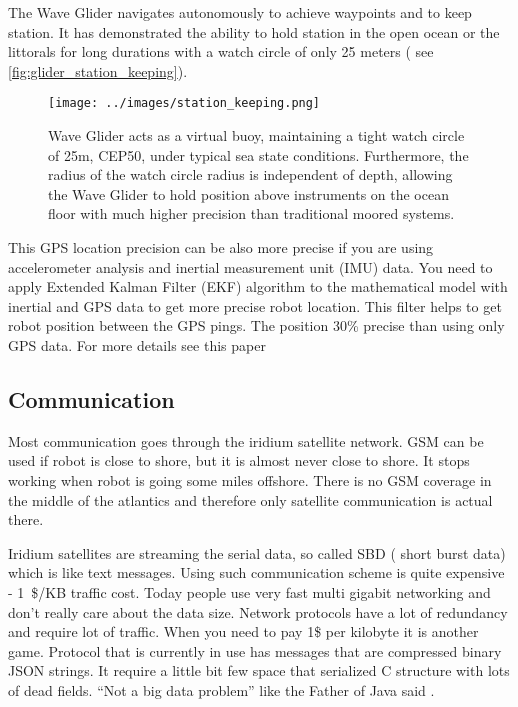 The Wave Glider navigates autonomously to achieve waypoints and to keep station. It has demonstrated the ability to hold station in the open ocean or the littorals for long durations with a watch circle of only 25 meters ( see \autoref{fig:glider_station_keeping}).


\begin{wrapfigure}{l}{8cm} %
	\centering	
	\texttt{[image: ../images/station\_keeping.png]}
	\caption{Wave Glider acts as a virtual buoy, maintaining a tight watch circle of 25m, CEP50, under typical sea state conditions. Furthermore, the radius of the watch circle radius is independent of depth, allowing the Wave Glider to hold position above instruments on the ocean floor with much higher precision than traditional moored systems.  \cite{5422129}} 
	\label{fig:glider_station_keeping}
\end{wrapfigure}

This GPS location precision can be also more precise if you are using accelerometer analysis and inertial measurement unit  (IMU) data. You need to apply Extended Kalman Filter (EKF) algorithm to the mathematical model with inertial and GPS data to get more precise robot location. This filter helps to get robot position between the GPS pings. The position 30\% precise  than using only GPS data. For more details see this paper \cite{6107207}


\subsection{Communication}

Most communication goes through the iridium satellite  network. GSM can be used if robot is close to shore, but it is almost never close to shore. It stops working when robot is  going some miles offshore. There is no GSM coverage in the middle of the atlantics and therefore only satellite communication is actual there.

Iridium satellites are streaming the serial data, so called SBD ( short burst data) which is like text messages. Using such communication scheme is quite expensive -   \mbox{1 \$/KB} traffic cost. Today people use very fast multi gigabit networking and don't really care about the data size. Network protocols have a lot of redundancy and require lot of traffic. When you need to pay 1\$ per kilobyte it is another game. Protocol that is currently in use has messages that are compressed binary JSON strings. It require a little bit few space that  serialized C structure with lots of dead fields. “Not a big data problem” like the Father of Java said \cite{video:james_gosling_on_youtube}. 



